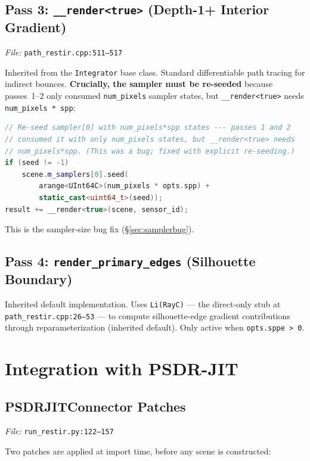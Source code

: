 \subsection{Pass 3: \texttt{\_\_render<true>} (Depth-1+ Interior Gradient)}

\emph{File:} \texttt{path\_restir.cpp:511--517}

Inherited from the \texttt{Integrator} base class. Standard differentiable
path tracing for indirect bounces. \textbf{Crucially, the sampler must be
re-seeded} because passes~1--2 only consumed \texttt{num\_pixels} sampler
states, but \texttt{\_\_render<true>} needs \texttt{num\_pixels * spp}:

\begin{lstlisting}[language=C++,basicstyle=\footnotesize\ttfamily]
// Re-seed sampler[0] with num_pixels*spp states --- passes 1 and 2
// consumed it with only num_pixels states, but __render<true> needs
// num_pixels*spp. (This was a bug; fixed with explicit re-seeding.)
if (seed != -1)
    scene.m_samplers[0].seed(
        arange<UInt64C>(num_pixels * opts.spp) +
        static_cast<uint64_t>(seed));
result += __render<true>(scene, sensor_id);
\end{lstlisting}

This is the sampler-size bug fix (\S\ref{sec:samplerbug}).

\subsection{Pass 4: \texttt{render\_primary\_edges} (Silhouette Boundary)}

Inherited default implementation. Uses \texttt{Li(RayC)} --- the
direct-only stub at \texttt{path\_restir.cpp:26--53} --- to compute
silhouette-edge gradient contributions through
reparameterization (inherited default). Only active when
\texttt{opts.sppe > 0}.

\section{Integration with PSDR-JIT}
\label{sec:integration}

\subsection{PSDRJITConnector Patches}

\emph{File:} \texttt{run\_restir.py:122--157}

Two patches are applied at import time, before any scene is constructed:

